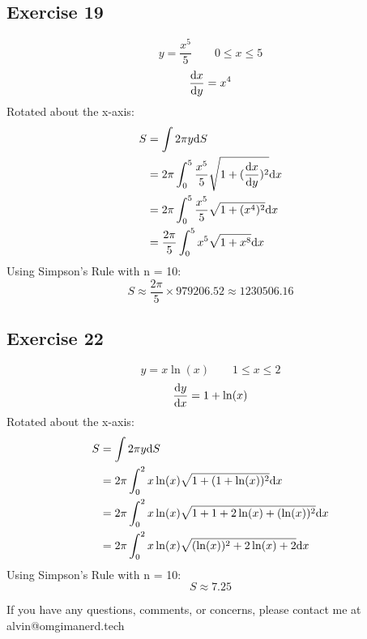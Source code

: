 \documentclass{math}
\begin{document}
\subsection*{Exercise 19}
\[ y = \frac{x^{5}}{5} \quad \quad 0 \leq x \leq 5 \]
\[ \frac{\mathrm{d}{x}}{\mathrm{d}{y}} = x^{4} \]
Rotated about the x-axis:
\begin{align*}
  S &= \int{2\pi y\mathrm{d}{S}} \\
  &= 2\pi\int_{0}^{5}{
    \frac{x^{5}}{5}\sqrt{1+(\frac{\mathrm{d}{x}}{\mathrm{d}{y}})^{2}}\mathrm{d}{x}} \\
  &= 2\pi\int_{0}^{5}{\frac{x^{5}}{5}\sqrt{1+(x^{4})^{2}}\mathrm{d}{x}} \\
  &= \frac{2\pi}{5}\int_{0}^{5}{x^{5}\sqrt{1+x^{8}}\mathrm{d}{x}} \\
\end{align*}
Using Simpson's Rule with n = 10:
\[ S \approx \frac{2\pi}{5} \times 979206.52 \approx 1230506.16 \]

\subsection*{Exercise 22}
\[ y = x\ln(x) \quad \quad 1 \leq x \leq 2 \]
\[ \frac{\mathrm{d}{y}}{\mathrm{d}{x}} = 1+\ln(x) \]
Rotated about the x-axis:
\begin{align*}
  S &= \int{2\pi y\mathrm{d}{S}} \\
  &= 2\pi\int_{0}^{2}{x\ln(x)\sqrt{1+(1+\ln(x))^{2}}\mathrm{d}{x}} \\
  &= 2\pi\int_{0}^{2}{x\ln(x)\sqrt{1+1+2\ln(x)+(\ln(x))^{2}}\mathrm{d}{x}} \\
  &= 2\pi\int_{0}^{2}{x\ln(x)\sqrt{(\ln(x))^{2}+2\ln(x)+2}\mathrm{d}{x}}
\end{align*}
Using Simpson's Rule with n = 10:
\[ S \approx 7.25 \]

\begin{center}
  If you have any questions, comments, or concerns, please contact me at
  alvin@omgimanerd.tech
\end{center}
\end{document}
